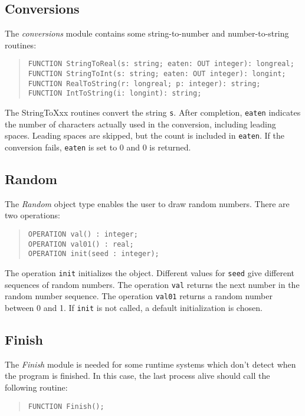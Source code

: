 \documentclass[10pt]{article}
\begin{document}
\subsection{Conversions}

The {\em conversions} module contains some string-to-number and number-to-string routines:
\begin{quote}
\begin{verbatim}
FUNCTION StringToReal(s: string; eaten: OUT integer): longreal;
FUNCTION StringToInt(s: string; eaten: OUT integer): longint;
FUNCTION RealToString(r: longreal; p: integer): string;
FUNCTION IntToString(i: longint): string;
\end{verbatim}
\end{quote}
The StringToXxx routines convert the string \verb+s+. After completion,
\verb+eaten+ indicates the number of characters actually used in the
conversion, including leading spaces. Leading spaces are skipped, but the count
is included in \verb+eaten+. If the conversion fails, \verb+eaten+ is set to 0
and 0 is returned.

\subsection{Random}

The {\em Random} object type enables the user to draw random numbers.
There are two operations:
\begin{quote}
\begin{verbatim}
OPERATION val() : integer;
OPERATION val01() : real;
OPERATION init(seed : integer);
\end{verbatim}
\end{quote}
The operation \verb+init+ initializes the object.
Different values for \verb+seed+ give different sequences of random numbers.
The operation \verb+val+ returns the next number in the random number
sequence.
The operation \verb+val01+ returns a random number between 0 and 1.
If \verb+init+ is not called, a default initialization is chosen.

\subsection{Finish}

The {\em Finish} module is needed for some runtime systems which don't detect when the
program is finished.
In this case, the last process alive should call the following routine:
\begin{quote}
\begin{verbatim}
FUNCTION Finish();
\end{verbatim}
\end{quote}
\end{document}

